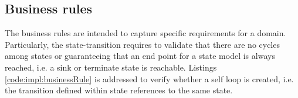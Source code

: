 	\subsection{Business rules}
		The business rules are intended to capture specific requirements for a domain. Particularly, the state-transition requires to validate that there are no cycles among states or guaranteeing that an end point for a state model is always reached, i.e. a sink or terminate state is reachable. Listings \ref{code:impl:businessRule} is addressed to verify whether a self loop is created, i.e. the transition defined within state references to the same state.
		

